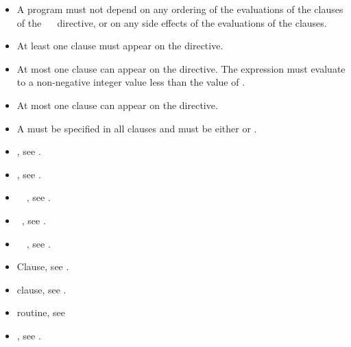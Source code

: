 \restrictions
\begin{itemize}
\item A program must not depend on any ordering of the evaluations of the clauses of the ~~ directive, or on any side effects of the evaluations of the clauses.
\item At least one  clause must appear on the directive.

\item At most one  clause can appear on the
  directive. The  expression must evaluate to a
  non-negative integer value less than the value of
  .

\item At most one  clause can appear on the directive.
\item A  must be specified in all  clauses and must be either  or .
\end{itemize}

\crossreferences
\begin{itemize}
\item {}, see .

\item {}, see .

\item {}~~, 
      see . 

\item {}~, see .

\item {}~~, 
      see .

\item {} Clause, see .

\item {} clause, see .

\item {} routine, see 
  
\item {}, see
.

\end{itemize}





